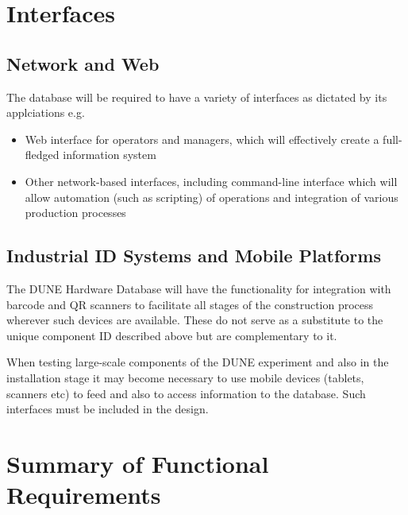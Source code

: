 \documentclass[pdftex,12pt,letter]{article}
\begin{document}
\section{Interfaces}

\subsection{Network and Web}

The database will be required to have a variety of interfaces as dictated by its applciations e.g.

\begin{itemize}

\item Web interface for operators and managers, which will effectively create a full-fledged information system

\item Other network-based interfaces, including command-line interface which will allow automation (such as scripting) of operations
and integration of various production processes

\end{itemize}

\subsection{Industrial ID Systems and Mobile Platforms}

The DUNE Hardware Database will have the functionality for integration with barcode and QR scanners to facilitate
all stages of the construction process wherever such devices are available. These do not serve as a substitute to the
unique component ID described above but are complementary to it.

When testing large-scale components of the DUNE experiment and also in the installation stage
it may become necessary to use mobile devices (tablets, scanners etc) to feed and also to access
information to the database. Such interfaces must be included in the design.

\section{Summary of Functional Requirements}
\end{document}
